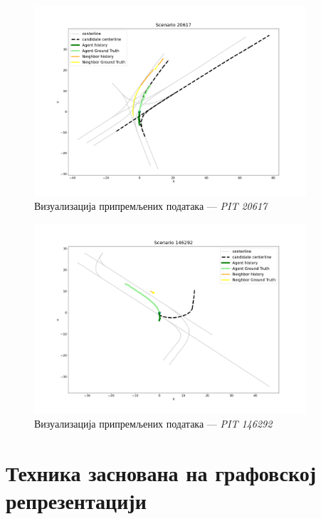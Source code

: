 \documentclass[11pt,oneside]{memoir}
\begin{document}
\begin{figure}[H]
  \includegraphics[width=0.9\textwidth]{images/scenario_PIT_20617.png}
  \caption{Визуализација припремљених података --- \textit{PIT 20617}}
  \label{scenario-example-PIT-20617}
\end{figure}

\begin{figure}[H]
  \includegraphics[width=0.9\textwidth]{images/scenario_PIT_146292.png}
  \caption{Визуализација припремљених података --- \textit{PIT 146292}}
  \label{scenario-example-PIT-146292}
\end{figure}

\chapter{Техника заснована на графовској репрезентацији}
\label{chp:razrada}
\end{document}
